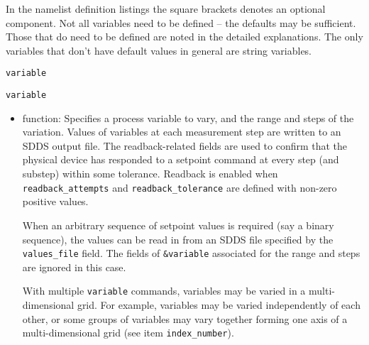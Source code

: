\begin{itemize}
\begin{itemize}
In the namelist definition listings the square brackets denotes an optional component.
Not all variables need to be defined -- the defaults may be sufficient.
Those that do need to be defined are noted in the detailed explanations.
The only variables that don't have default values in general are string variables.


\begin{latexonly}
\newpage\begin{center}{\Large \verb+variable+}\end{center}
\end{latexonly}
\begin{htmlonly}
\item {\Large \verb+variable+}
\end{htmlonly}
\begin{itemize}
        \item function: Specifies a process variable to vary, and the range and steps of the variation.
        Values of variables at each measurement step are written to an SDDS output file.
        The readback-related fields are used to confirm that the physical device has responded 
        to a setpoint command at every step (and substep) within some tolerance. Readback is enabled
        when {\verb+readback_attempts+} and {\verb+readback_tolerance+} are defined with non-zero positive values.

        When an arbitrary sequence of setpoint values is required (say a binary sequence), 
        the values can be read in from an SDDS file specified by the {\verb+values_file+} field. 
        The fields of \verb+&variable+ associated for the range and steps are ignored in this case.

         With multiple \verb+variable+ commands,
         variables may be varied in a multi-dimensional grid. For example,
        variables may be varied independently of each other, or some groups of
        variables may vary together forming one axis of a multi-dimensional grid
         (see item {\verb+index_number+}). 


\end{itemize}
\end{itemize}
\end{itemize}
